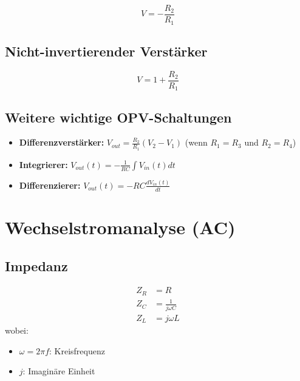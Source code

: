 \documentclass{article}
\begin{document}
\begin{equation*}
    V = -\frac{R_2}{R_1}
\end{equation*}

\subsection*{Nicht-invertierender Verstärker}

\begin{equation*}
    V = 1 + \frac{R_2}{R_1}
\end{equation*}

\subsection*{Weitere wichtige OPV-Schaltungen}
\begin{itemize}
    \item \textbf{Differenzverstärker:} $V_{out} = \frac{R_2}{R_1}(V_2 - V_1)$ (wenn $R_1 = R_3$ und $R_2 = R_4$)
    \item \textbf{Integrierer:} $V_{out}(t) = -\frac{1}{RC} \int V_{in}(t) dt$
    \item \textbf{Differenzierer:} $V_{out}(t) = -RC \frac{dV_{in}(t)}{dt}$
\end{itemize}

\section*{Wechselstromanalyse (AC)}

\subsection*{Impedanz}
\begin{align*}
    Z_R &= R \\
    Z_C &= \frac{1}{j\omega C} \\
    Z_L &= j\omega L
\end{align*}
wobei:
\begin{itemize}
    \item $\omega = 2\pi f$: Kreisfrequenz
    \item $j$: Imaginäre Einheit
\end{itemize}
\end{document}
